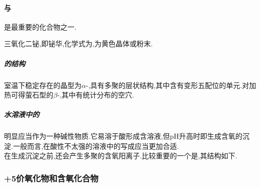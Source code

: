 \documentclass{ctexart}
\begin{document}
\paragraph{与}
是最重要的化合物之一.
\begin{substance}
    三氧化二铋,即铋华,化学式为,为黄色晶体或粉末.
\end{substance}
\subparagraph{的结构}
室温下稳定存在的晶型为$\alpha$-,具有多聚的层状结构,其中含有变形五配位的单元.对加热可得萤石型的$\beta$-,其中有统计分布的空穴.
\subparagraph{水溶液中的}
明显应当作为一种碱性物质.它易溶于酸形成含溶液,但pH升高时即生成含氧的沉淀.一般而言,在酸性不太强的溶液中的写成应当更加合适.\\
\indent 在生成沉淀之前,还会产生多聚的含氧阳离子.比较重要的一个是,其结构如下.
\subsubsection{+5价氧化物和含氧化合物}
\end{document}
